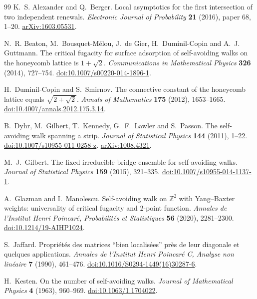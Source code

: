 \documentclass[11pt]{article}
\numberwithin{equation}{section}
\theoremstyle{definition}\newtheorem{definition}[theorem]{Definition}
\theoremstyle{remark}\newtheorem{remark}[theorem]{Remark}
\begin{document}
\begin{thebibliography}{99}
K.~S. Alexander and Q.~Berger.
Local asymptotics for the first intersection of two independent renewals.
\emph{Electronic Journal of Probability} \textbf{21} (2016), paper 68, 1--20.
\href{https://arxiv.org/abs/1603.05531}{arXiv:1603.05531}.

N.~R. Beaton, M.~Bousquet-M\'elou, J.~de Gier, H.~Duminil-Copin and A.~J. Guttmann.
The critical fugacity for surface adsorption of self-avoiding walks on the
honeycomb lattice is $1+\sqrt2$.
\emph{Communications in Mathematical Physics} \textbf{326} (2014), 727--754.
\href{https://doi.org/10.1007/s00220-014-1896-1}{doi:10.1007/s00220-014-1896-1}.

H.~Duminil-Copin and S.~Smirnov.
The connective constant of the honeycomb lattice equals $\sqrt{2+\sqrt2}$.
\emph{Annals of Mathematics} \textbf{175} (2012), 1653--1665.
\href{https://doi.org/10.4007/annals.2012.175.3.14}{doi:10.4007/annals.2012.175.3.14}.

B.~Dyhr, M.~Gilbert, T.~Kennedy, G.~F.~Lawler and S.~Passon.
The self-avoiding walk spanning a strip.
\emph{Journal of Statistical Physics} \textbf{144} (2011), 1--22.
\href{https://doi.org/10.1007/s10955-011-0258-z}
{doi:10.1007/s10955-011-0258-z}.
\href{https://arxiv.org/abs/1008.4321}{arXiv:1008.4321}.

M.~J.~Gilbert.
The fixed irreducible bridge ensemble for self-avoiding walks.
\emph{Journal of Statistical Physics} \textbf{159} (2015), 321--335.
\href{https://doi.org/10.1007/s10955-014-1137-1}
{doi:10.1007/s10955-014-1137-1}.

A.~Glazman and I.~Manolescu.
Self-avoiding walk on $\mathbb Z^2$ with Yang--Baxter weights:
universality of critical fugacity and 2-point function.
\emph{Annales de l'Institut Henri Poincar\'e, Probabilit\'es et Statistiques}
\textbf{56} (2020), 2281--2300.
\href{https://doi.org/10.1214/19-AIHP1024}{doi:10.1214/19-AIHP1024}.

S.~Jaffard.
Propri\'et\'es des matrices ``bien localis\'ees'' pr\`es de leur diagonale
et quelques applications.
\emph{Annales de l'Institut Henri Poincar\'e C, Analyse non lin\'eaire}
\textbf{7} (1990), 461--476.
\href{https://doi.org/10.1016/S0294-1449(16)30287-6}{doi:10.1016/S0294-1449(16)30287-6}.

H.~Kesten.
On the number of self-avoiding walks.
\emph{Journal of Mathematical Physics} \textbf{4} (1963), 960--969.
\href{https://doi.org/10.1063/1.1704022}{doi:10.1063/1.1704022}.


\end{thebibliography}
\end{document}
